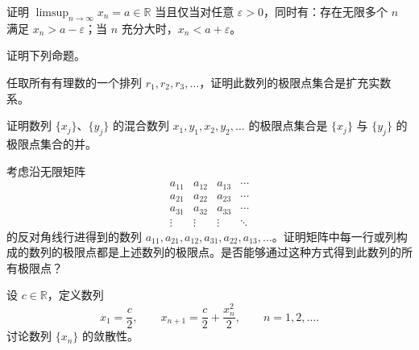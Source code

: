 \noindent\begin{minipage}{\textwidth}
证明 $\limsup_{n\to\infty}x_n=a\in\mathbb R$ 当且仅当对任意 $\varepsilon>0$，同时有：存在无限多个 $n$ 满足 $x_n>a-\varepsilon$；当 $n$ 充分大时，$x_n<a+\varepsilon$。
\end{minipage}\par\vfill
\newpage
\noindent\begin{minipage}{\textwidth}
证明下列命题。
\end{minipage}\par\vfill
\noindent\begin{minipage}{\textwidth}
任取所有有理数的一个排列 $r_1,r_2,r_3,\ldots$，证明此数列的极限点集合是扩充实数系。
\end{minipage}\par\vfill
\noindent\begin{minipage}{\textwidth}
证明数列 $\{x_j\}$、$\{y_j\}$ 的混合数列 $x_1,y_1,x_2,y_2,\ldots$ 的极限点集合是 $\{x_j\}$ 与 $\{y_j\}$ 的极限点集合的并。
\end{minipage}\par\vfill
\noindent\begin{minipage}{\textwidth}
考虑沿无限矩阵\[\begin{matrix}a_{11}&a_{12}&a_{13}&\cdots\\a_{21}&a_{22}&a_{23}&\cdots\\a_{31}&a_{32}&a_{33}&\cdots\\\vdots&\vdots&\vdots&\ddots\end{matrix}\]的反对角线行进得到的数列 $a_{11},a_{21},a_{12},a_{31},a_{22},a_{13},\ldots$。证明矩阵中每一行或列构成的数列的极限点都是上述数列的极限点。是否能够通过这种方式得到此数列的所有极限点？
\end{minipage}\par\vfill
\newpage
\noindent\begin{minipage}{\textwidth}
设 $c\in\mathbb R$，定义数列\[x_1=\frac c2,\qquad x_{n+1}=\frac c2+\frac{x_n^2}{2},\qquad n=1,2,\ldots.\]讨论数列 $\{x_n\}$ 的敛散性。
\end{minipage}\par\vfill
